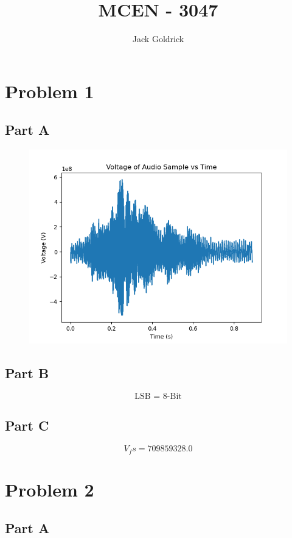 \documentclass[]{report}
\title{MCEN - 3047}
\author{Jack Goldrick}
\begin{document}
\maketitle

\section{Problem 1}

\subsection{Part A}


	\begin{figure}[H]
	\centering
	\includegraphics[width=0.7\linewidth]{../results/p1_t}
\end{figure}


\subsection{Part B}

$$ \text{LSB = 8-Bit} $$

\subsection{Part C}

$$V_fs = 709859328.0$$


\section{Problem 2}

\subsection{Part A}
\end{document}
